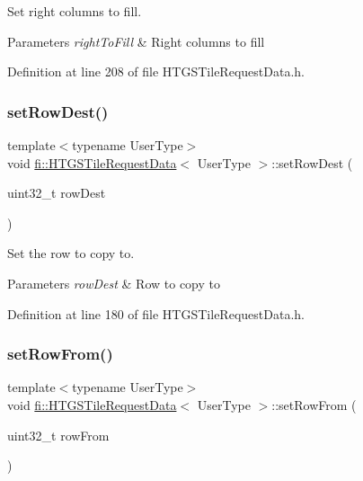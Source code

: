 Set right columns to fill. 


\begin{DoxyParams}{Parameters}
{\em right\+To\+Fill} & Right columns to fill \\
\hline
\end{DoxyParams}


Definition at line 208 of file H\+T\+G\+S\+Tile\+Request\+Data.\+h.

\mbox{\label{classfi_1_1HTGSTileRequestData_aea752262298f85b03aed2c0e27c35cec}} 
\subsubsection{\texorpdfstring{set\+Row\+Dest()}{setRowDest()}}
{\footnotesize\ttfamily template$<$typename User\+Type$>$ \\
void \hyperlink{classfi_1_1HTGSTileRequestData}{fi\+::\+H\+T\+G\+S\+Tile\+Request\+Data}$<$ User\+Type $>$\+::set\+Row\+Dest (\begin{DoxyParamCaption}\item[{uint32\+\_\+t}]{row\+Dest }\end{DoxyParamCaption})\hspace{0.3cm}{\ttfamily [inline]}}



Set the row to copy to. 


\begin{DoxyParams}{Parameters}
{\em row\+Dest} & Row to copy to \\
\hline
\end{DoxyParams}


Definition at line 180 of file H\+T\+G\+S\+Tile\+Request\+Data.\+h.

\mbox{\label{classfi_1_1HTGSTileRequestData_af601174888d365c99f2e0c4ef43ce19d}} 
\subsubsection{\texorpdfstring{set\+Row\+From()}{setRowFrom()}}
{\footnotesize\ttfamily template$<$typename User\+Type$>$ \\
void \hyperlink{classfi_1_1HTGSTileRequestData}{fi\+::\+H\+T\+G\+S\+Tile\+Request\+Data}$<$ User\+Type $>$\+::set\+Row\+From (\begin{DoxyParamCaption}\item[{uint32\+\_\+t}]{row\+From }\end{DoxyParamCaption})\hspace{0.3cm}{\ttfamily [inline]}}



